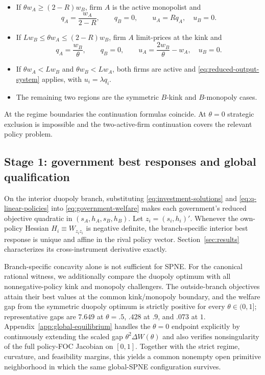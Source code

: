 \begin{itemize}
\item If $\theta w_A\geq(2-R)w_B$, firm $A$ is the active monopolist and
\[
q_A=\frac{w_A}{2-R},\qquad q_B=0,
\qquad u_A=Rq_A,\quad u_B=0.
\]
\item If $Lw_B\leq\theta w_A\leq(2-R)w_B$, firm $A$ limit-prices at the kink and
\[
q_A=\frac{w_B}{\theta},\qquad q_B=0,
\qquad u_A=\frac{2w_B}{\theta}-w_A,\quad u_B=0.
\]
\item If $\theta w_A<Lw_B$ and $\theta w_B<Lw_A$, both firms are active and \eqref{eq:reduced-output-system} applies, with $u_i=\lambda q_i$.
\item The remaining two regions are the symmetric $B$-kink and $B$-monopoly cases.
\end{itemize}

At the regime boundaries the continuation formulas coincide. At $\theta=0$ strategic exclusion is impossible and the two-active-firm continuation covers the relevant policy problem.

\subsection{Stage 1: government best responses and global qualification}

On the interior duopoly branch, substituting \eqref{eq:investment-solutions} and \eqref{eq:q-linear-policies} into \eqref{eq:government-welfare} makes each government's reduced objective quadratic in $(s_A,h_A,s_B,h_B)$. Let $z_i=(s_i,h_i)'$. Whenever the own-policy Hessian $H_i\equiv W_{z_i z_i}$ is negative definite, the branch-specific interior best response is unique and affine in the rival policy vector. Section~\ref{sec:results} characterizes its cross-instrument derivative exactly.

Branch-specific concavity alone is not sufficient for SPNE. For the canonical rational witness, we additionally compare the duopoly optimum with all nonnegative-policy kink and monopoly challengers. The outside-branch objectives attain their best values at the common kink/monopoly boundary, and the welfare gap from the symmetric duopoly optimum is strictly positive for every $\theta\in(0,1]$; representative gaps are $7.649$ at $\theta=.5$, $.428$ at $.9$, and $.073$ at $1$. Appendix~\ref{app:global-equilibrium} handles the $\theta=0$ endpoint explicitly by continuously extending the scaled gap $\theta^2\Delta W(\theta)$ and also verifies nonsingularity of the full policy-FOC Jacobian on $[0,1]$. Together with the strict regime, curvature, and feasibility margins, this yields a common nonempty open primitive neighborhood in which the same global-SPNE configuration survives.

